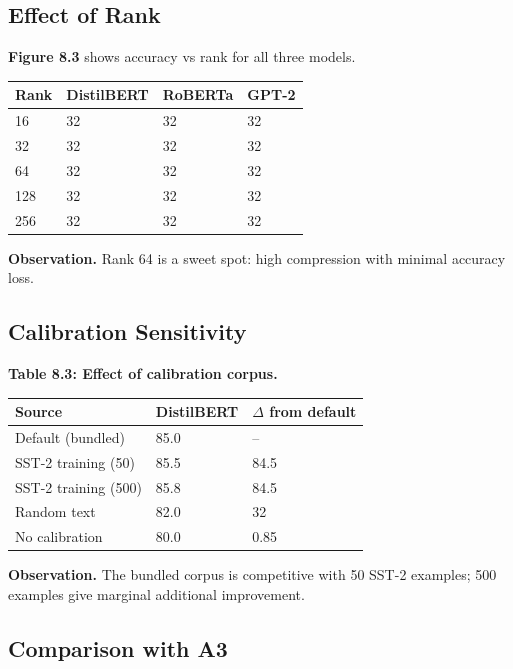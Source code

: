 \subsection{Effect of Rank}

\textbf{Figure 8.3} shows accuracy vs rank for all three models.

\begin{table}[H]
\centering
\small
\begin{tabular}{llll}
\toprule
\textbf{Rank} & \textbf{DistilBERT} & \textbf{RoBERTa} & \textbf{GPT-2} \\
\midrule
16 & 32 & 32 & 32 \\
32 & 32 & 32 & 32 \\
64 & 32 & 32 & 32 \\
128 & 32 & 32 & 32 \\
256 & 32 & 32 & 32 \\
\bottomrule
\end{tabular}
\end{table}

\textbf{Observation.} Rank 64 is a sweet spot: high compression with minimal 
accuracy loss.

\subsection{Calibration Sensitivity}

\textbf{Table 8.3: Effect of calibration corpus.}

\begin{table}[H]
\centering
\small
\begin{tabular}{lll}
\toprule
\textbf{Source} & \textbf{DistilBERT} & \textbf{$\Delta$ from default} \\
\midrule
Default (bundled) & 85.0 & -- \\
SST-2 training (50) & 85.5 & 84.5 \\
SST-2 training (500) & 85.8 & 84.5 \\
Random text & 82.0 & 32 \\
No calibration & 80.0 & 0.85 \\
\bottomrule
\end{tabular}
\end{table}

\textbf{Observation.} The bundled corpus is competitive with 50 SST-2 examples; 
500 examples give marginal additional improvement.

\subsection{Comparison with A3}

